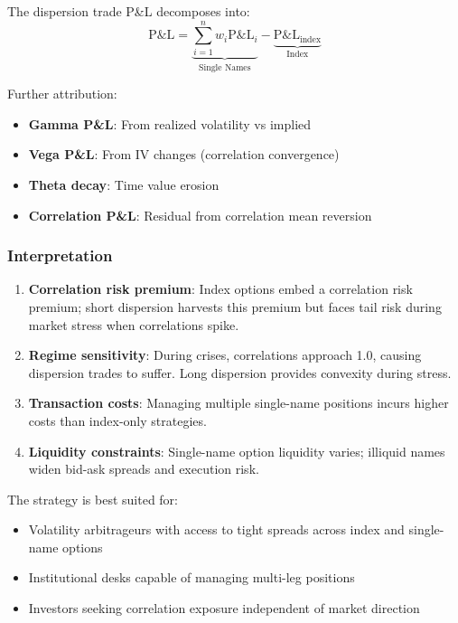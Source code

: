 The dispersion trade P\&L decomposes into:
\[
\text{P\&L} = \underbrace{\sum_{i=1}^n w_i \text{P\&L}_i}_{\text{Single Names}} - \underbrace{\text{P\&L}_{\text{index}}}_{\text{Index}}
\]

Further attribution:
\begin{itemize}
  \item \textbf{Gamma P\&L}: From realized volatility vs implied
  \item \textbf{Vega P\&L}: From IV changes (correlation convergence)
  \item \textbf{Theta decay}: Time value erosion
  \item \textbf{Correlation P\&L}: Residual from correlation mean reversion
\end{itemize}

\subsubsection{Interpretation}

\begin{enumerate}
  \item \textbf{Correlation risk premium}: Index options embed a correlation risk premium; short dispersion harvests this premium but faces tail risk during market stress when correlations spike.

  \item \textbf{Regime sensitivity}: During crises, correlations approach 1.0, causing dispersion trades to suffer. Long dispersion provides convexity during stress.

  \item \textbf{Transaction costs}: Managing multiple single-name positions incurs higher costs than index-only strategies.

  \item \textbf{Liquidity constraints}: Single-name option liquidity varies; illiquid names widen bid-ask spreads and execution risk.
\end{enumerate}

The strategy is best suited for:
\begin{itemize}
  \item Volatility arbitrageurs with access to tight spreads across index and single-name options
  \item Institutional desks capable of managing multi-leg positions
  \item Investors seeking correlation exposure independent of market direction
\end{itemize}

